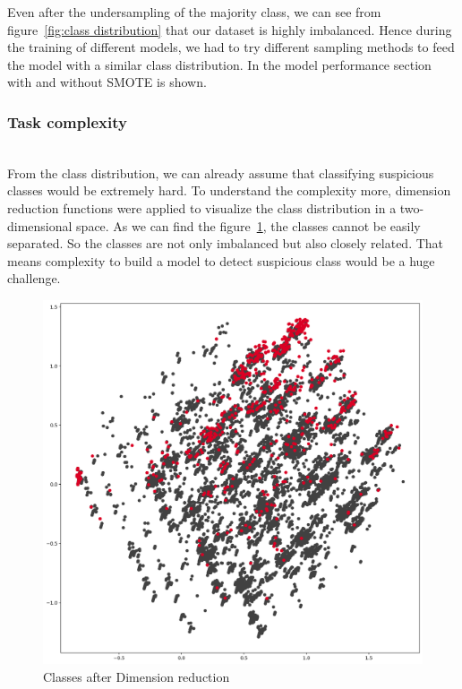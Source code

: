 Even after the undersampling of the majority class, we can see from figure~\ref{fig:class distribution} that our dataset is highly imbalanced. Hence during the training of different models, we had to try different sampling methods to feed the model with a similar class distribution. In the model performance section with and without SMOTE is shown. 

\subsubsection{Task complexity}\hspace*{\fill} \\
From the class distribution, we can already assume that classifying suspicious classes would be extremely hard. To understand the complexity more, dimension reduction functions were applied to visualize the class distribution in a two-dimensional space. As we can find the figure~\ref{fig:Dimension reduction}, the classes cannot be easily separated. So the classes are not only imbalanced but also closely related. That means complexity to build a model to detect suspicious class would be a huge challenge.
 
\begin{figure}[H]
    \centering
    \includegraphics[width=\linewidth]{figures/pca_2d.png}
    \caption{Classes after Dimension reduction}
    \label{fig:Dimension reduction}
\end{figure}


